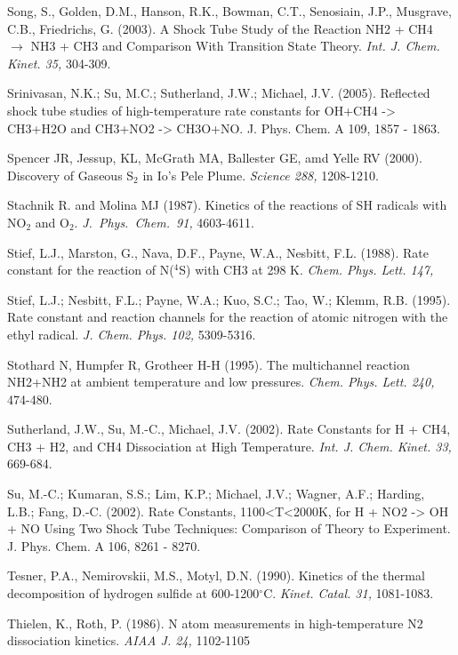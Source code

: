 \documentclass[12pt,landscape]{article}
\newcounter{reaction}
\begin{document}
Song, S., Golden, D.M., Hanson, R.K., Bowman, C.T., Senosiain, J.P., Musgrave, C.B., Friedrichs, G. (2003). A Shock Tube Study of the Reaction NH2 + CH4 $\rightarrow$ NH3 + CH3 and Comparison With Transition State Theory.  {\em Int. J. Chem. Kinet. 35,} 304-309.

Srinivasan, N.K.; Su, M.C.; Sutherland, J.W.; Michael, J.V. (2005).  Reflected shock tube studies of high-temperature rate constants for OH+CH4 -> CH3+H2O and CH3+NO2 -> CH3O+NO.  J. Phys. Chem. A  109,  1857 - 1863.

Spencer JR, Jessup, KL, McGrath MA, Ballester GE, amd Yelle RV (2000). Discovery of Gaseous S$_2$ in Io's Pele Plume. {\em Science 288,} 1208-1210.

Stachnik R. and Molina MJ  (1987). Kinetics of the reactions of SH radicals with NO$_2$ and O$_2$. {\em  J.\ Phys.\ Chem.\  91,} 4603-4611.

Stief, L.J., Marston, G., Nava, D.F., Payne, W.A., Nesbitt, F.L. (1988). Rate constant for the reaction of N($^4$S) with CH3 at 298 K.  {\em Chem. Phys. Lett. 147,}

Stief, L.J.; Nesbitt, F.L.; Payne, W.A.; Kuo, S.C.; Tao, W.; Klemm, R.B. (1995). Rate constant and reaction channels for the reaction of atomic nitrogen with the ethyl radical. {\em  J. Chem. Phys. 102,} 5309-5316.

Stothard N, Humpfer R, Grotheer H-H (1995). The multichannel reaction NH2+NH2 at ambient temperature and low pressures. {\em Chem. Phys. Lett. 240,} 474-480.

Sutherland, J.W., Su, M.-C., Michael, J.V. (2002). Rate Constants for H + CH4, CH3 + H2, and CH4 Dissociation at High Temperature. {\em Int. J. Chem. Kinet. 33,} 669-684.

Su, M.-C.; Kumaran, S.S.; Lim, K.P.; Michael, J.V.; Wagner, A.F.; Harding, L.B.; Fang, D.-C. (2002).   Rate Constants, 1100<T<2000K, for H + NO2 -> OH + NO Using Two Shock Tube Techniques: Comparison of Theory to Experiment.  J. Phys. Chem. A   106, 8261 - 8270.

Tesner, P.A., Nemirovskii, M.S., Motyl, D.N. (1990). Kinetics of the thermal decomposition of hydrogen sulfide at 600-1200$^{\circ}$C.  {\em Kinet. Catal. 31,} 1081-1083.

Thielen, K., Roth, P. (1986).  N atom measurements in high-temperature N2 dissociation kinetics. {\em AIAA J.  24,} 1102-1105
\end{document}
